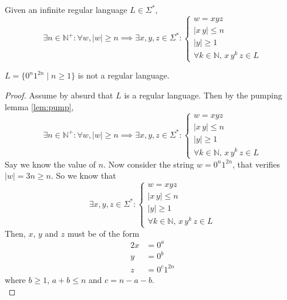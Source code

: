 \documentclass[docid=TP07]{tcom_TP}
\begin{document}
\setcounter{chapter}{6}
{

\begin{lemma} \label{lem:pump}
Given an infinite regular language $L \in \Sigma^*$,
\begin{equation*}
	\exists n \in \mathbb{N}^+ \colon \forall w, |w|\geq n \implies \exists x, y, z \in \Sigma^* \colon 
	\begin{cases}
		w = xyz \\
		|x\,y| \leq n\\
		|y| \geq 1\\
		\forall k \in \mathbb{N},\,x\,y^k\,z \in L
	\end{cases}
\end{equation*} 
\end{lemma}
\begin{theorem}
	$L=\{0^n1^{2n}\mid n\geq 1\}$ is not a regular language.
\end{theorem}
\begin{proof}
Assume by absurd that $L$ is a regular language. Then by the pumping lemma \eqref{lem:pump},
\begin{equation*}
	\exists n \in \mathbb{N}^+ \colon \forall w, |w|\geq n \implies \exists x, y, z \in \Sigma^* \colon 
	\begin{cases}
		w = xyz \\
		|x\,y| \leq n\\
		|y| \geq 1\\
		\forall k \in \mathbb{N},\,x\,y^k\,z \in L
\end{cases}
\end{equation*}
Say we know the value of $n$. Now consider the string $w=0^n1^{2n}$, that verifies $|w|=3n \geq n$. So we know that
\begin{equation*}
\exists x, y, z \in \Sigma^* \colon 
\begin{cases}
	w = xyz \\
	|x\,y| \leq n\\
	|y| \geq 1\\
	\forall k \in \mathbb{N},\,x\,y^k\,z \in L
\end{cases}
\end{equation*}
Then, $x$, $y$ and $z$ must be of the form
\begin{alignat*}{2}
	x &= 0^a\\
	y &= 0^b\\
	z &= 0^c1^{2n}
\end{alignat*}
where $b \geq 1$, $a+b \leq n$ and $c=n-a-b$.\\

\end{proof}}
\end{document}
